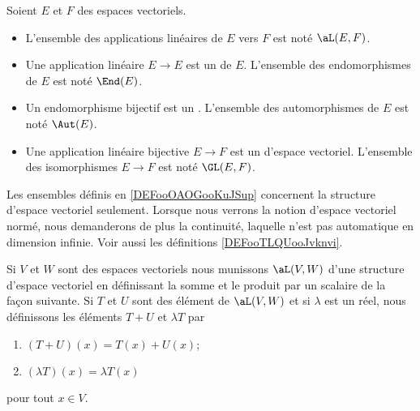 \begin{definition}      \label{DEFooOAOGooKuJSup}
    Soient \( E\) et \( F\) des espaces vectoriels. 
    \begin{itemize}
        \item
        L'ensemble des applications linéaires de \( E\) vers \( F\) est noté $\aL(E,F)$.
        \item Une application linéaire \( E\to E\) est un  de \( E\). L'ensemble des endomorphismes de \( E\) est noté \( \End(E)\).
        \item Un endomorphisme bijectif est un . L'ensemble des automorphismes de \( E\) est noté \( \Aut(E)\).
        \item
            Une application linéaire bijective \( E\to F\) est un  d'espace vectoriel. L'ensemble des isomorphismes \( E\to F\) est noté \( \GL(E,F)\).
    \end{itemize}
\end{definition}

\begin{remark}
    Les ensembles définis en \ref{DEFooOAOGooKuJSup} concernent la structure d'espace vectoriel seulement. Lorsque nous verrons la notion d'espace vectoriel normé, nous demanderons de plus la continuité, laquelle n'est pas automatique en dimension infinie. Voir aussi les définitions \ref{DEFooTLQUooJvknvi}.
\end{remark}

\begin{definition}  \label{DefDQRooVGbzSm}
    Si \( V\) et \( W\) sont des espaces vectoriels nous munissons \( \aL(V,W)\) d'une structure d'espace vectoriel en définissant la somme et le produit par un scalaire de la façon suivante. Si $T$ et $U$ sont des élément de $\aL(V,W)$ et si $\lambda$ est un réel, nous définissons les éléments $T+U$ et $\lambda T$ par
    \begin{enumerate}
        \item
            $(T+U)(x)=T(x)+U(x)$;
        \item
            $(\lambda T)(x)=\lambda T(x)$
    \end{enumerate}
    pour tout \( x\in V\).
\end{definition}

